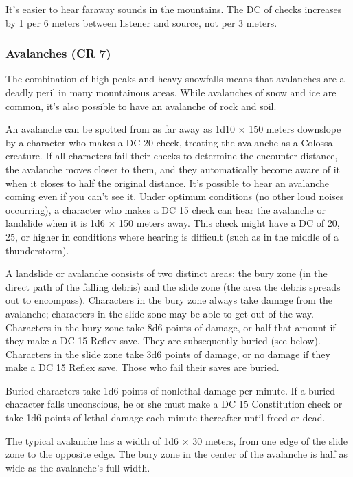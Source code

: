 It's easier to hear faraway sounds in the mountains. The DC of  checks increases by 1 per 6 meters between listener and source, not per 3 meters.

\subsubsection{Avalanches (CR 7)}
The combination of high peaks and heavy snowfalls means that avalanches are a deadly peril in many mountainous areas. While avalanches of snow and ice are common, it's also possible to have an avalanche of rock and soil.

An avalanche can be spotted from as far away as 1d10 $\times$ 150 meters downslope by a character who makes a DC 20  check, treating the avalanche as a Colossal creature. If all characters fail their  checks to determine the encounter distance, the avalanche moves closer to them, and they automatically become aware of it when it closes to half the original distance. It's possible to hear an avalanche coming even if you can't see it. Under optimum conditions (no other loud noises occurring), a character who makes a DC 15  check can hear the avalanche or landslide when it is 1d6 $\times$ 150 meters away. This check might have a DC of 20, 25, or higher in conditions where hearing is difficult (such as in the middle of a thunderstorm).

A landslide or avalanche consists of two distinct areas: the bury zone (in the direct path of the falling debris) and the slide zone (the area the debris spreads out to encompass). Characters in the bury zone always take damage from the avalanche; characters in the slide zone may be able to get out of the way. Characters in the bury zone take 8d6 points of damage, or half that amount if they make a DC 15 Reflex save. They are subsequently buried (see below). Characters in the slide zone take 3d6 points of damage, or no damage if they make a DC 15 Reflex save. Those who fail their saves are buried.

Buried characters take 1d6 points of nonlethal damage per minute. If a buried character falls unconscious, he or she must make a DC 15 Constitution check or take 1d6 points of lethal damage each minute thereafter until freed or dead.

The typical avalanche has a width of 1d6 $\times$ 30 meters, from one edge of the slide zone to the opposite edge. The bury zone in the center of the avalanche is half as wide as the avalanche's full width.

